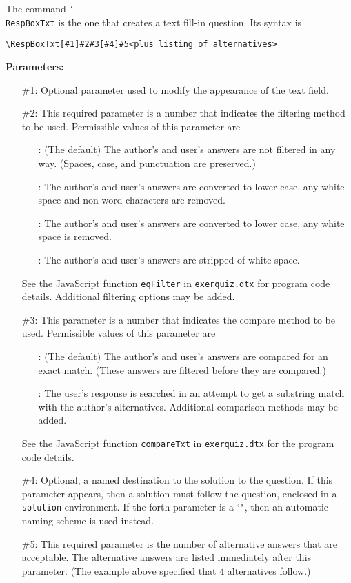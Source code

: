 \documentclass{article}
\newcommand{\cs}[1]{\texttt{\char`\\#1}}
\begin{document}
\medskip\noindent
The command \cs{RespBoxTxt} is the one that creates a text fill-in question. Its
syntax is
\begin{verbatim}
\RespBoxTxt[#1]#2#3[#4]#5<plus listing of alternatives>
\end{verbatim}
\noindent\textbf{\hypertarget{paraRespBoxTxt}{Parameters:}}
\begin{enumerate}
\item[\ttfamily\#1:]Optional parameter used to modify the appearance of the
    text field.
\item[\ttfamily\#2:]This required parameter is a number that indicates
the filtering method to be used. Permissible values of this parameter are
\begin{enumerate}
    \item[\ttfamily-1:] (The default) The author's and user's answers are not filtered
    in any way. (Spaces, case, and punctuation are preserved.)
    \item[\ttfamily0:] The author's and user's answers are converted to
    lower case, any white space and non-word characters are removed.
    \item[\ttfamily1:] The author's and user's answers are converted to
    lower case, any white space is removed.
    \item[\ttfamily2:] The author's and user's answers are stripped of
    white space.
\end{enumerate}
See the JavaScript function \texttt{eqFilter} in \texttt{exerquiz.dtx} for
program code details.  Additional filtering options may be added.

\item[\ttfamily\#3:] This parameter is a number that indicates the compare
method to be used. Permissible values of this parameter are
\begin{enumerate}
    \item[\ttfamily0:] (The default) The author's and user's answers are
    compared for an exact match. (These answers are filtered before they are
    compared.)
    \item[\ttfamily1:] The user's response is searched in an attempt to
    get a substring match with the author's alternatives. Additional comparison
    methods may be added.
\end{enumerate}
See the JavaScript function \texttt{compareTxt} in
\texttt{exerquiz.dtx} for the program code details.

\item[\ttfamily\#4:] Optional, a named destination to the
solution to the question. If this parameter appears, then a
solution must follow the question, enclosed in a \texttt{solution}
environment.  If the forth parameter is a `\texttt*', then an automatic
naming scheme is used instead.
\item[\ttfamily\#5:] This required parameter is the
number of alternative answers that are acceptable. The alternative
answers are listed immediately after this parameter. (The example
above specified that $4$ alternatives follow.)
\end{enumerate}
\end{document}
